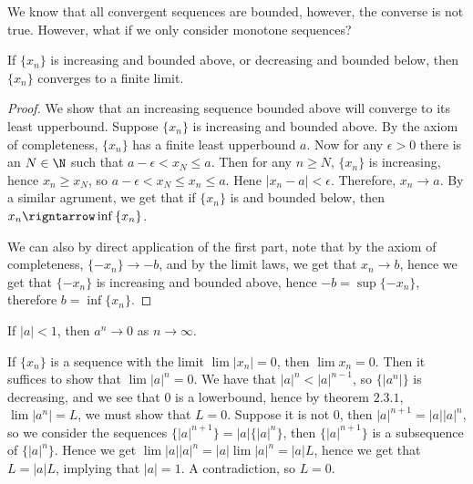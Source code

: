 We know that all convergent sequences are bounded, however, the converse is not 
true. However, what if we only consider monotone sequences?

\begin{theorem}\label{2.3.1}
    If $\{x_n\}$ is increasing and bounded above, or decreasing and bounded 
    below, then $\{x_n\}$ converges to a finite limit.
\end{theorem}
\begin{proof}
   We show that an increasing sequence bounded above will converge to its least 
   upperbound. Suppose $\{x_n\}$ is increasing and bounded above. By the axiom 
   of completeness,  $\{x_n\}$ has a finite least upperbound $a$. Now for any 
   $\epsilon>0$ there is an  $N \in \N$ such that  $a-\epsilon < x_N \leq a$. 
   Then for any  $n \geq N$,  $\{x_n\}$ is increasing, hence  $x_n \geq x_N$, so  
   $a- \epsilon < x_N \leq x_n \leq a$. Hene $|x_n-a|<\epsilon$. Therefore, 
   $x_n \rightarrow a$. By a similar agrument, we get that if $\{x_n\}$ is 
   \decreasing and bounded below, then  $x_n \rigntarrow \inf{\{x_n\}}$.

   We can also by direct application of the first part, note that by the axiom 
   of completeness, $\{-x_n\} \rightarrow -b$, and by the limit laws, we get 
   that  $x_n \rightarrow b$, hence we get that  $\{-x_n\}$ is increasing and 
   bounded above, hence  $-b=\sup{\{-x_n\}}$, therefore  $b=\inf{\{x_n\}}$.
\end{proof}

\begin{example}
    If $|a|<1$, then $a^n \rightarrow 0$ as $n \rightarrow \infty$. 
\end{example}
\begin{solution}
    If $\{x_n\}$ is a sequence with the limit  $\lim{|x_n|}=0$, then 
    $\lim{x_n}=0$. Then it suffices to show that $\lim{|a|^n}=0$. We have that 
    $|a|^n<|a|^{n-1}$, so  $\{|a^n|\}$ is decreasing, and we see that  $0$ is a 
    lowerbound, hence by theorem $2.3.1$, $\lim{|a^n|}=L$, we must show that 
    $L=0$. Suppose it is not $0$, then  $|a|^{n+1}=|a||a|^n$, so we consider the 
    sequences  $\{|a|^{n+1}\}=|a|\{|a|^n\}$, then $\{|a|^{n+1}\}$ is a subsequence 
    of  $\{|a|^n\}$. Hence we get $\lim{|a||a|^n}=|a|\lim{|a|^n}=|a|L$, hence 
    we get that  $L=|a|L$, implying that $|a|=1$. A contradiction, so $L=0$.
\end{solution}

